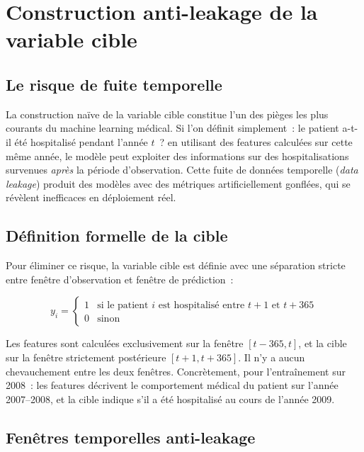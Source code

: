 \section{Construction anti-leakage de la variable cible}

\subsection{Le risque de fuite temporelle}

La construction naïve de la variable cible constitue l'un des pièges les plus courants
du machine learning médical. Si l'on définit simplement~: \og le patient a-t-il été
hospitalisé pendant l'année $t$~?\fg{} en utilisant des features calculées sur cette
même année, le modèle peut exploiter des informations sur des hospitalisations survenues
\textit{après} la période d'observation. Cette fuite de données temporelle
(\textit{data leakage}) produit des modèles avec des métriques artificiellement gonflées,
qui se révèlent inefficaces en déploiement réel.

\subsection{Définition formelle de la cible}

Pour éliminer ce risque, la variable cible est définie avec une séparation stricte
entre fenêtre d'observation et fenêtre de prédiction~:

\begin{equation}
\label{eq:cible}
y_i =
\begin{cases}
1 & \text{si le patient } i \text{ est hospitalisé entre } t+1 \text{ et } t+365 \\
0 & \text{sinon}
\end{cases}
\end{equation}

\noindent Les features sont calculées exclusivement sur la fenêtre $[t-365, t]$, et
la cible sur la fenêtre strictement postérieure $[t+1, t+365]$. Il n'y a aucun
chevauchement entre les deux fenêtres. Concrètement, pour l'entraînement sur 2008~:
les features décrivent le comportement médical du patient sur l'année 2007--2008,
et la cible indique s'il a été hospitalisé au cours de l'année 2009.

\subsection{Fenêtres temporelles anti-leakage}

